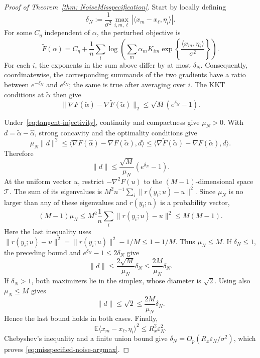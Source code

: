 \documentclass[12pt]{iopart}
\theoremstyle{remark}
\begin{document}
\begin{proof}[Proof of Theorem~\ref{thm: NoiseMisspecification}]
Start by locally defining
\[
\delta_N:=\frac1{\sigma^2}
\max_{i,m,\ell}|\langle x_m-x_\ell,\eta_i\rangle|.
\]
For some $C_\eta$ independent of $\alpha$, the perturbed objective is
\[
\widetilde F(\alpha)=C_\eta+\frac1n\sum_i
\log\left(\sum_m\alpha_mK_{im}
\exp\!\left\{\frac{\langle x_m,\eta_i\rangle}{\sigma^2}\right\}\right).
\]
For each $i$, the exponents in the sum above differ by at most $\delta_N$.
Consequently, coordinatewise, the corresponding summands of the two
gradients have a ratio between $e^{-\delta_N}$ and $e^{\delta_N}$; the same
is true after averaging over $i$. The KKT conditions at $\widetilde\alpha$
then give
\[
\|\nabla F(\widetilde\alpha)
-\nabla\widetilde F(\widetilde\alpha)\|_2
\leq\sqrt M(e^{\delta_N}-1).
\]

Under~\eqref{eq:tangent-injectivity}, continuity and compactness give
$\mu_N>0$. With $d=\widetilde\alpha-\widehat\alpha$, strong concavity and
the optimality conditions give
\[
\mu_N\|d\|^2
\leq\langle\nabla F(\widehat\alpha)
-\nabla F(\widetilde\alpha),d\rangle
\leq\langle\nabla\widetilde F(\widetilde\alpha)
-\nabla F(\widetilde\alpha),d\rangle.
\]
Therefore
\[
\|d\|\leq\frac{\sqrt M}{\mu_N}(e^{\delta_N}-1).
\]
At the uniform vector $u$, restrict $-\nabla^2F(u)$ to the
$(M-1)$-dimensional space $\mathcal T$. The sum of its eigenvalues is
$M^2n^{-1}\sum_i\|r(y_i;u)-u\|^2$. Since $\mu_N$ is no larger than any of
these eigenvalues and $r(y_i;u)$ is a probability vector,
\[
(M-1)\mu_N
\leq M^2\frac1n\sum_i\|r(y_i;u)-u\|^2
\leq M(M-1).
\]
Here the last inequality uses
$\|r(y_i;u)-u\|^2=\|r(y_i;u)\|^2-1/M\leq1-1/M$.
Thus $\mu_N\leq M$. If $\delta_N\leq1$, the preceding bound and
$e^{\delta_N}-1\leq2\delta_N$ give
\[
\|d\|\leq\frac{2\sqrt M}{\mu_N}\delta_N
\leq\frac{2M}{\mu_N}\delta_N.
\]
If $\delta_N>1$, both maximizers lie in the simplex, whose diameter is
$\sqrt2$. Using also $\mu_N\leq M$ gives
\[
\|d\|\leq\sqrt2\leq\frac{2M}{\mu_N}\delta_N.
\]
Hence the last bound holds in both cases.
Finally,
\[
\mathbb E\langle x_m-x_\ell,\eta_i\rangle^2
\leq R_x^2\varepsilon_N^2.
\]
Chebyshev's inequality and a finite union bound give
$\delta_N=O_p(R_x\varepsilon_N/\sigma^2)$, which proves
\eqref{eq:misspecified-noise-argmax}.
\end{proof}
\end{document}
